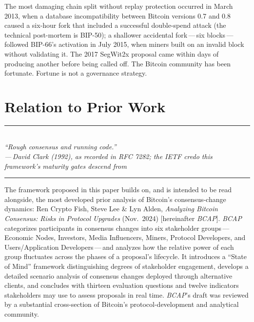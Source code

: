 \documentclass[11pt, twoside, openright]{book}
\newcommand{\pullquote}[1]{%
  \begin{center}
  {\color{bitcoinorange}\rule{1.4cm}{0.8pt}}\\[5pt]
  {\itshape\large #1}\\[5pt]
  {\color{bitcoinorange}\rule{1.4cm}{0.8pt}}
  \end{center}}
\begin{document}
The most damaging chain split without replay protection occurred in March 2013, when a database incompatibility between Bitcoin versions 0.7 and 0.8 caused a six-hour fork that included a successful double-spend attack (the technical post-mortem is BIP-50); a shallower accidental fork\,---\,six blocks\,---\,followed BIP-66's activation in July 2015, when miners built on an invalid block without validating it. The 2017 SegWit2x proposal came within days of producing another before being called off. The Bitcoin community has been fortunate. Fortune is not a governance strategy.

\section{Relation to Prior Work}

\pullquote{``Rough consensus and running code.''\\[3pt]{\normalsize\upshape ---\,David Clark (1992), as recorded in RFC 7282; the IETF credo this framework's maturity gates descend from}}

The framework proposed in this paper builds on, and is intended to be read alongside, the most developed prior analysis of Bitcoin's consensus-change dynamics: Ren Crypto Fish, Steve Lee \& Lyn Alden, \textit{Analyzing Bitcoin Consensus: Risks in Protocol Upgrades} (Nov.~2024) [hereinafter \textit{BCAP}]. \textit{BCAP} categorizes participants in consensus changes into six stakeholder groups\,---\,Economic Nodes, Investors, Media Influencers, Miners, Protocol Developers, and Users/Application Developers\,---\,and analyzes how the relative power of each group fluctuates across the phases of a proposal's lifecycle. It introduces a ``State of Mind'' framework distinguishing degrees of stakeholder engagement, develops a detailed scenario analysis of consensus changes deployed through alternative clients, and concludes with thirteen evaluation questions and twelve indicators stakeholders may use to assess proposals in real time. \textit{BCAP}'s draft was reviewed by a substantial cross-section of Bitcoin's protocol-development and analytical community.
\end{document}
